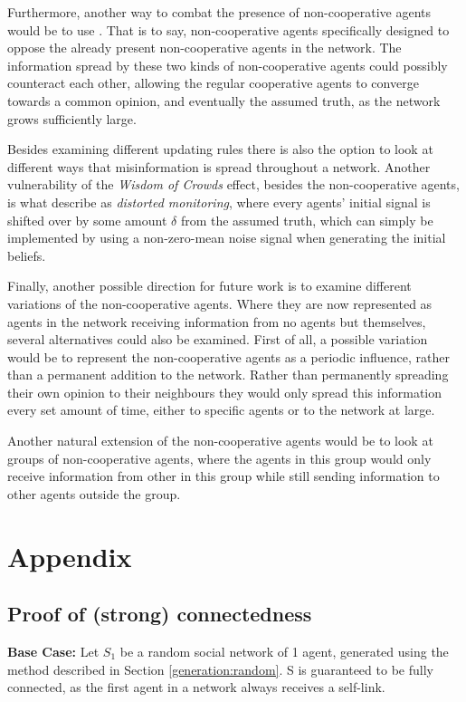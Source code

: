 \documentclass[a4paper, 12pt]{report}
\begin{document}
\noindent Furthermore, another way to combat the presence of non-cooperative agents would be to use . That is to say, non-cooperative agents specifically designed to oppose the already present non-cooperative agents in the network. The information spread by these two kinds of non-cooperative agents could possibly counteract each other, allowing the regular cooperative agents to converge towards a common opinion, and eventually the assumed truth, as the network grows sufficiently large.

\noindent Besides examining different updating rules there is also the option to look at different ways that misinformation is spread throughout a network. Another vulnerability of the \emph{Wisdom of Crowds} effect, besides the non-cooperative agents, is what \parencite{amir2021robust} describe as \emph{distorted monitoring}, where every agents' initial signal is shifted over by some amount $\delta$ from the assumed truth, which can simply be implemented by using a non-zero-mean noise signal when generating the initial beliefs.

\noindent Finally, another possible direction for future work is to examine different variations of the non-cooperative agents. Where they are now represented as agents in the network receiving information from no agents but themselves, several alternatives could also be examined. First of all, a possible variation would be to represent the non-cooperative agents as a periodic influence, rather than a permanent addition to the network. Rather than permanently spreading their own opinion to their neighbours they would only spread this information every set amount of time, either to specific agents or to the network at large. 

\noindent Another natural extension of the non-cooperative agents would be to look at groups of non-cooperative agents, where the agents in this group would only receive information from other in this group while still sending information to other agents outside the group.

\newpage

\printbibliography

\newpage

\chapter{Appendix}
\section{Proof of (strong) connectedness}
\label{proof:conn}
\textbf{Base Case:} \newline
Let $S_1$ be a random social network of 1 agent, generated using the method described in Section \ref{generation:random}.
S is guaranteed to be fully connected, as the first agent in a network always receives a self-link.\newline
\end{document}
